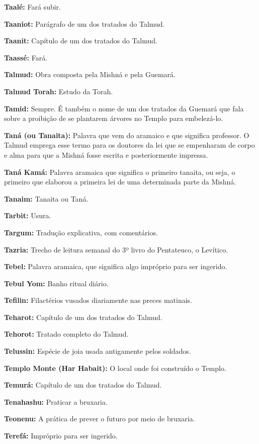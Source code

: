 \begin{hangparas}{.25in}{1}
{\textbf{Taalé:} Fará subir.

\textbf{Taaniot:} Parágrafo de um dos tratados do Talmud.

\textbf{Taanit:} Capítulo de um dos tratados do Talmud.

\textbf{Taassé:} Fará.

\textbf{Talmud:} Obra composta pela Mishná e pela Guemará.

\textbf{Talmud Torah:} Estudo da Torah.

\textbf{Tamid:} Sempre. É também o nome de um dos tratados da Guemará
que fala sobre a proibição de se plantarem árvores no Templo para
embelezá-lo.

\textbf{Taná (ou Tanaita):} Palavra que vem do aramaico e que significa
professor. O Talmud emprega esse termo para os doutores da lei que se
empenharam de corpo e alma para que a Mishná fosse escrita e
posteriormente impressa.

\textbf{Taná Kamá:} Palavra aramaica que significa o primeiro tanaita,
ou seja, o primeiro que elaborou a primeira lei de uma determinada
parte da Mishná.

\textbf{Tanaim:} Tanaita ou Taná.

\textbf{Tarbit:} Usura.

\textbf{Targum:} Tradução explicativa, com comentários.

\textbf{Tazria:} Trecho de leitura semanal do 3º livro do Pentateuco, o Levítico.

\textbf{Tebel:} Palavra aramaica, que significa algo
impróprio para ser ingerido.

\textbf{Tebul Yom:} Banho ritual diário.

\textbf{Tefilin:} Filactérios vusados diariamente nas preces matinais.

\textbf{Teharot:} Capítulo de um dos tratados do Talmud.

\textbf{Tehorot:} Tratado completo do Talmud.

\textbf{Telussin:} Espécie de joia usada antigamente pelos soldados.

\textbf{Templo Monte (Har Habait):} O local onde foi construído o Templo.

\textbf{Temurá:} Capítulo de um dos tratados do Talmud.

\textbf{Tenahashu:} Praticar a bruxaria.

\textbf{Teonenu:} A prática de prever o futuro por meio de bruxaria.

\textbf{Terefá:} Impróprio para ser ingerido.

}
\end{hangparas}
